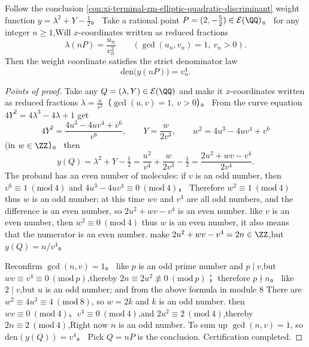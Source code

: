 \begin{conclusion}\label{con:xi-terminal-zm-elliptic-denominator-fourth-power}
Follow the conclusion \ref{con:xi-terminal-zm-elliptic-quadratic-discriminant} weight function \(y=\lambda^{2}+Y-\tfrac12\)。
Take a rational point \(P=(2,-\tfrac52)\in\mathcal{E}(\QQ)\)。
for any integer \(n\ge 1\),Will \(x\)-coordinates written as reduced fractions
\[
\lambda(nP)=\frac{u_n}{v_n^{2}}\qquad(\gcd(u_n,v_n)=1,\ v_n>0).
\]
Then the weight coordinate satisfies the strict denominator law
\[
\mathrm{den}\bigl(y(nP)\bigr)=v_n^{4}.
\]
\end{conclusion}
\begin{proof}[Points of proof]
Take any \(Q=(\lambda,Y)\in\mathcal{E}(\QQ)\) and make it \(x\)-coordinates written as reduced fractions
\(
\lambda=\frac{u}{v^{2}}
\)（\(\gcd(u,v)=1,\ v>0\)）。
From the curve equation
\(
4Y^{2}=4\lambda^{3}-4\lambda+1
\)
get
\[
4Y^{2}=\frac{4u^{3}-4uv^{4}+v^{6}}{v^{6}},
\qquad
Y=\frac{w}{2v^{3}},
\qquad
w^{2}=4u^{3}-4uv^{4}+v^{6}
\]
(in \(w\in\ZZ\)）。
then
\[
y(Q)=\lambda^{2}+Y-\tfrac12
=\frac{u^{2}}{v^{4}}+\frac{w}{2v^{3}}-\tfrac12
=\frac{2u^{2}+wv-v^{4}}{2v^{4}}.
\]
The proband has an even number of molecules: if \(v\) is an odd number, then \(v^{6}\equiv 1\ (\mathrm{mod}\ 4)\) and \(4u^{3}-4uv^{4}\equiv 0\ (\mathrm{mod}\ 4)\)，
Therefore \(w^{2}\equiv 1\ (\mathrm{mod}\ 4)\) thus \(w\) is an odd number; at this time \(wv\) and \(v^{4}\) are all odd numbers, and the difference is an even number, so \(2u^{2}+wv-v^{4}\) is an even number.
like \(v\) is an even number, then \(w^{2}\equiv 0\ (\mathrm{mod}\ 4)\) thus \(w\) is an even number, it also means that the numerator is an even number.
make \(2u^{2}+wv-v^{4}=2n\in\ZZ\),but \(y(Q)=n/v^{4}\)。
\par
Reconfirm \(\gcd(n,v)=1\)。
like \(p\) is an odd prime number and \(p\mid v\),but \(wv\equiv v^{4}\equiv 0\ (\mathrm{mod}\ p)\),thereby
\(
2n\equiv 2u^{2}\not\equiv 0\ (\mathrm{mod}\ p)
\)；
therefore \(p\nmid n\)。
like \(2\mid v\),but \(u\) is an odd number; and from the above formula in module \(8\) There are
\(
w^{2}\equiv 4u^{3}\equiv 4\ (\mathrm{mod}\ 8)
\), so \(w=2k\) and \(k\) is an odd number.
then \(wv\equiv 0\ (\mathrm{mod}\ 4)\)、\(v^{4}\equiv 0\ (\mathrm{mod}\ 4)\),and \(2u^{2}\equiv 2\ (\mathrm{mod}\ 4)\),thereby \(2n\equiv 2\ (\mathrm{mod}\ 4)\),Right now \(n\) is an odd number.
To sum up \(\gcd(n,v)=1\), so \(\mathrm{den}(y(Q))=v^{4}\)。
Pick \(Q=nP\) is the conclusion. Certification completed.
\end{proof}


